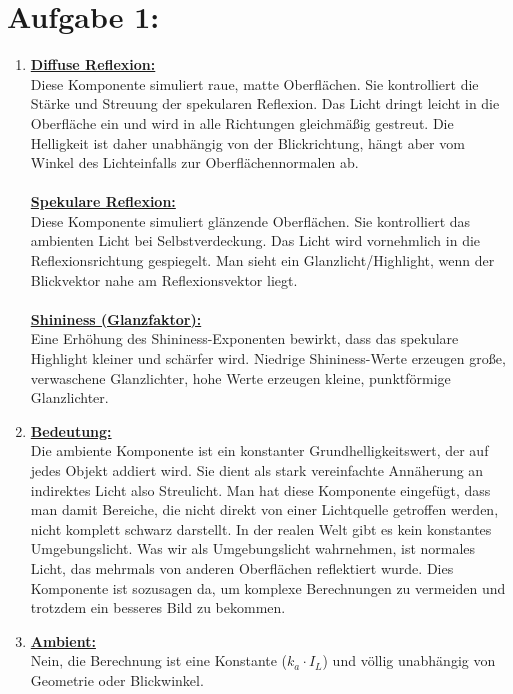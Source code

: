 \documentclass[11pt]{article}
\begin{document}
\section*{Aufgabe 1:}
\begin{enumerate}
  \item \textbf{\underline{Diffuse Reflexion:}} \\ Diese Komponente simuliert raue, matte Oberflächen. Sie kontrolliert die Stärke und Streuung der spekularen Reflexion. Das Licht dringt leicht in die Oberfläche ein und wird in alle Richtungen gleichmäßig gestreut. Die Helligkeit ist daher unabhängig von der Blickrichtung, hängt aber vom Winkel des Lichteinfalls zur Oberflächennormalen ab. \\\\
  \textbf{\underline{Spekulare Reflexion:}} \\Diese Komponente simuliert glänzende Oberflächen. Sie kontrolliert das ambienten Licht bei Selbstverdeckung. Das Licht wird vornehmlich in die Reflexionsrichtung gespiegelt. Man sieht ein Glanzlicht/Highlight, wenn der Blickvektor nahe am Reflexionsvektor liegt.\\\\
  \textbf{\underline{Shininess (Glanzfaktor):}} \\Eine Erhöhung des Shininess-Exponenten bewirkt, dass das spekulare Highlight kleiner und schärfer wird. Niedrige Shininess-Werte erzeugen große, verwaschene Glanzlichter, hohe Werte erzeugen kleine, punktförmige Glanzlichter.
  \item \textbf{\underline{Bedeutung:}} \\Die ambiente Komponente ist ein konstanter Grundhelligkeitswert, der auf jedes Objekt addiert wird. Sie dient als stark vereinfachte Annäherung an indirektes Licht also Streulicht. Man hat diese Komponente eingefügt, dass man damit Bereiche, die nicht direkt von einer Lichtquelle getroffen werden, nicht komplett schwarz darstellt. In der realen Welt gibt es kein konstantes Umgebungslicht. Was wir als Umgebungslicht wahrnehmen, ist normales Licht, das mehrmals von anderen Oberflächen reflektiert wurde. Dies Komponente ist sozusagen da, um komplexe Berechnungen zu vermeiden und trotzdem ein besseres Bild zu bekommen.
  \item \textbf{\underline{Ambient:}}\\ Nein, die Berechnung ist eine Konstante ($k_a \cdot I_L$) und völlig unabhängig von Geometrie oder Blickwinkel. \\\\

\end{enumerate}
\end{document}
